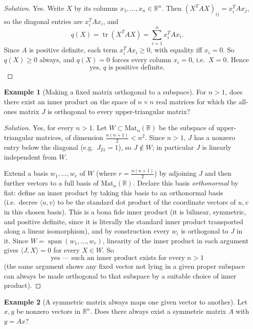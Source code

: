 \documentclass[11pt]{article}
\theoremstyle{definition}
\newtheorem{example}{Example}[section]
\newcommand{\R}{\mathbb{R}}
\newcommand{\Span}{\operatorname{span}}
\newcommand{\trace}{\operatorname{tr}}
\begin{document}
\begin{proof}[Solution]
Yes. Write $X$ by its columns $x_1,\dots,x_n\in\R^n$. Then $(X^TAX)_{ij}=x_i^TAx_j$, so the diagonal entries are $x_i^TAx_i$, and
\[
q(X)=\trace(X^TAX)=\sum_{i=1}^n x_i^TAx_i.
\]
Since $A$ is positive definite, each term $x_i^TAx_i\ge0$, with equality iff $x_i=0$. So $q(X)\ge0$ always, and $q(X)=0$ forces every column $x_i=0$, i.e.\ $X=0$. Hence
\[
\boxed{\text{yes, } q \text{ is positive definite}}.
\]
\end{proof}

\begin{example}[Making a fixed matrix orthogonal to a subspace]
For $n>1$, does there exist an inner product on the space of $n\times n$ real matrices for which the all-ones matrix $J$ is orthogonal to every upper-triangular matrix?
\end{example}

\begin{proof}[Solution]
Yes, for every $n>1$. Let $W\subset\mathrm{Mat}_n(\R)$ be the subspace of upper-triangular matrices, of dimension $\tfrac{n(n+1)}2<n^2$. Since $n>1$, $J$ has a nonzero entry below the diagonal (e.g.\ $J_{21}=1$), so $J\notin W$; in particular $J$ is linearly independent from $W$.

Extend a basis $w_1,\dots,w_r$ of $W$ (where $r=\tfrac{n(n+1)}2$) by adjoining $J$ and then further vectors to a full basis of $\mathrm{Mat}_n(\R)$. Declare this basis \emph{orthonormal} by fiat: define an inner product by taking this basis to an orthonormal basis (i.e.\ decree $\langle u,v\rangle$ to be the standard dot product of the coordinate vectors of $u,v$ in this chosen basis). This is a bona fide inner product (it is bilinear, symmetric, and positive definite, since it is literally the standard inner product transported along a linear isomorphism), and by construction every $w_i$ is orthogonal to $J$ in it. Since $W=\Span(w_1,\dots,w_r)$, linearity of the inner product in each argument gives $\langle J,X\rangle=0$ for every $X\in W$. So
\[
\boxed{\text{yes — such an inner product exists for every } n>1}
\]
(the same argument shows any fixed vector not lying in a given proper subspace can always be made orthogonal to that subspace by a suitable choice of inner product).
\end{proof}

\begin{example}[A symmetric matrix always maps one given vector to another]
Let $x,y$ be nonzero vectors in $\R^n$. Does there always exist a symmetric matrix $A$ with $y=Ax$?
\end{example}
\end{document}
